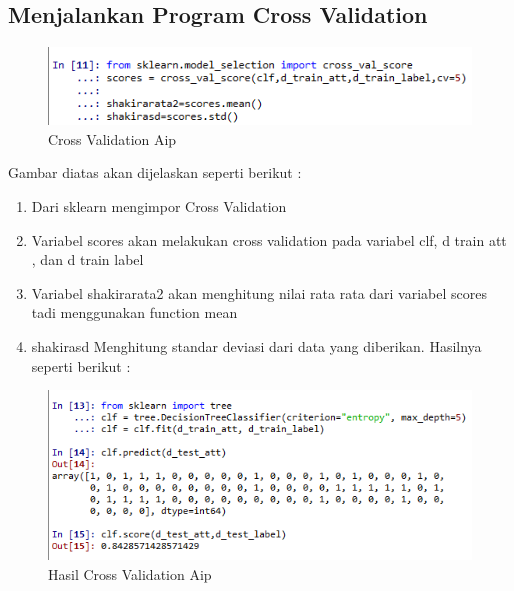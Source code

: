 \subsection{ Menjalankan Program Cross Validation}
\begin{figure}[!hbtp]
\centering
\includegraphics[scale=0.5]{figures/AIP/c5.PNG}
\caption{Cross Validation Aip}
\label{Aplikasi Pandas}
\end{figure}
Gambar diatas akan dijelaskan seperti berikut :
\begin{enumerate}
\item Dari sklearn mengimpor Cross Validation
\item Variabel scores akan melakukan cross validation pada variabel clf, d train att , dan d train label
\item Variabel shakirarata2 akan menghitung nilai rata rata dari variabel scores tadi menggunakan function mean
\item shakirasd Menghitung standar deviasi dari data yang diberikan. Hasilnya seperti berikut :
\end{enumerate}
\begin{figure}[!hbtp]
\centering
\includegraphics[scale=0.5]{figures/AIP/c6.PNG}
\caption{Hasil Cross Validation Aip}
\label{Cross Validation}
\end{figure}

